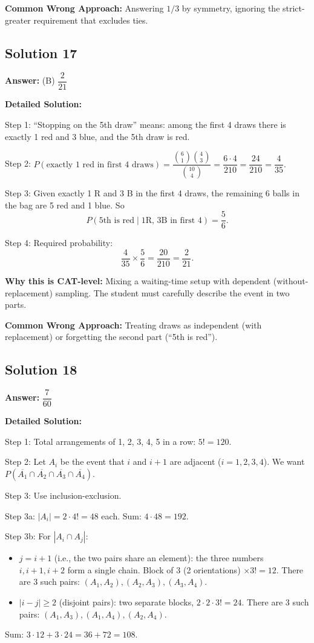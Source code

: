 \documentclass[11pt]{article}
\begin{document}
\textbf{Common Wrong Approach:} Answering \( 1/3 \) by symmetry, ignoring the strict-greater requirement that excludes ties.

\subsection*{Solution 17}
\textbf{Answer:} (B) \( \dfrac{2}{21} \)

\textbf{Detailed Solution:}

Step 1: ``Stopping on the 5th draw'' means: among the first 4 draws there is exactly 1 red and 3 blue, and the 5th draw is red.

Step 2: \( P(\text{exactly 1 red in first 4 draws}) = \dfrac{\binom{6}{1}\binom{4}{3}}{\binom{10}{4}} = \dfrac{6 \cdot 4}{210} = \dfrac{24}{210} = \dfrac{4}{35}. \)

Step 3: Given exactly 1 R and 3 B in the first 4 draws, the remaining 6 balls in the bag are 5 red and 1 blue. So
\[
P(\text{5th is red} \mid \text{1R, 3B in first 4}) = \dfrac{5}{6}.
\]

Step 4: Required probability:
\[
\dfrac{4}{35} \times \dfrac{5}{6} = \dfrac{20}{210} = \dfrac{2}{21}.
\]

\textbf{Why this is CAT-level:} Mixing a waiting-time setup with dependent (without-replacement) sampling. The student must carefully describe the event in two parts.

\textbf{Common Wrong Approach:} Treating draws as independent (with replacement) or forgetting the second part (``5th is red'').

\subsection*{Solution 18}
\textbf{Answer:} \( \dfrac{7}{60} \)

\textbf{Detailed Solution:}

Step 1: Total arrangements of 1, 2, 3, 4, 5 in a row: \( 5! = 120 \).

Step 2: Let \( A_i \) be the event that \( i \) and \( i+1 \) are adjacent (\( i = 1, 2, 3, 4 \)). We want \( P(\overline{A_1} \cap \overline{A_2} \cap \overline{A_3} \cap \overline{A_4}) \).

Step 3: Use inclusion-exclusion.

Step 3a: \( |A_i| = 2 \cdot 4! = 48 \) each. Sum: \( 4 \cdot 48 = 192 \).

Step 3b: For \( |A_i \cap A_j| \):
\begin{itemize}
\item \( j = i + 1 \) (i.e., the two pairs share an element): the three numbers \( i, i+1, i+2 \) form a single chain. Block of 3 (2 orientations) \( \times 3! = 12 \). There are 3 such pairs: \( (A_1, A_2), (A_2, A_3), (A_3, A_4) \).
\item \( |i - j| \ge 2 \) (disjoint pairs): two separate blocks, \( 2 \cdot 2 \cdot 3! = 24 \). There are 3 such pairs: \( (A_1, A_3), (A_1, A_4), (A_2, A_4) \).
\end{itemize}
Sum: \( 3 \cdot 12 + 3 \cdot 24 = 36 + 72 = 108 \).
\end{document}
